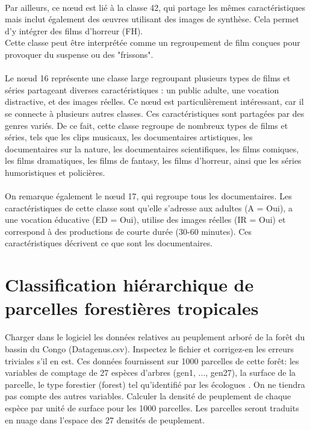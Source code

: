 \documentclass{article}
\begin{document}
\\
Par ailleurs, ce nœud est lié à la classe 42, qui partage les mêmes caractéristiques mais inclut également des œuvres utilisant des images de synthèse. Cela permet d’y intégrer des films d’horreur (FH).
\\
Cette classe peut être interprétée comme un regroupement de film conçues pour provoquer du suspense ou des "frissons".
\\
\\
Le nœud 16 représente une classe large regroupant plusieurs types de films et séries partageant diverses caractéristiques : un public adulte, une vocation distractive, et des images réelles. Ce nœud est particulièrement intéressant, car il se connecte à plusieurs autres classes. Ces caractéristiques sont partagées par des genres variés. De ce fait, cette classe regroupe de nombreux types de films et séries, tels que les clips musicaux, les documentaires artistiques, les documentaires sur la nature, les documentaires scientifiques, les films comiques, les films dramatiques, les films de fantasy, les films d’horreur, ainsi que les séries humoristiques et policières.
\\
\\
On remarque également le nœud 17, qui regroupe tous les documentaires. Les caractéristiques de cette classe sont qu’elle s’adresse aux adultes (A = Oui), a une vocation éducative (ED = Oui), utilise des images réelles (IR = Oui) et correspond à des productions de courte durée (30-60 minutes). Ces caractéristiques décrivent ce que sont les documentaires.
\\



\section{Classification hiérarchique de parcelles forestières tropicales}
Charger dans le logiciel les données relatives au peuplement arboré de la forêt du bassin du Congo
(Datagenus.csv). Inspectez le fichier et corrigez-en les erreurs triviales s'il en est. Ces données fournissent
sur 1000 parcelles de cette forêt: les variables de comptage de 27 espèces d'arbres (gen1, ..., gen27), la
surface de la parcelle, le type forestier (forest) tel qu'identifié par les écologues . On ne tiendra pas compte
des autres variables. Calculer la densité de peuplement de chaque espèce par unité de surface pour les 1000
parcelles. Les parcelles seront traduits en nuage dans l'espace des 27 densités de peuplement.
\end{document}
